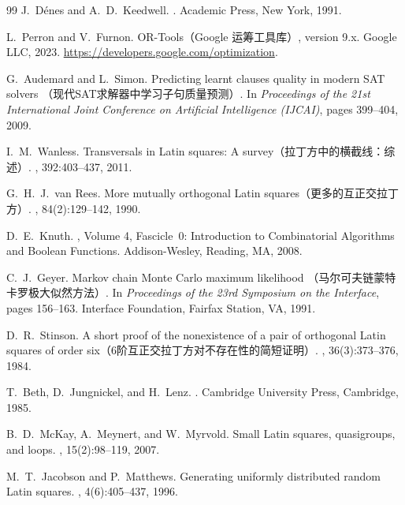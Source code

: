 \documentclass[11pt,a4paper]{ctexart}
\theoremstyle{remark}
\begin{document}
\begin{thebibliography}{99}
J.\ D\'enes and A.\ D.\ Keedwell.
.
\newblock Academic Press, New York, 1991.

L.\ Perron and V.\ Furnon.
\newblock OR-Tools（Google 运筹工具库）, version 9.x.
\newblock Google LLC, 2023.
\newblock \url{https://developers.google.com/optimization}.

G.\ Audemard and L.\ Simon.
\newblock Predicting learnt clauses quality in modern SAT solvers
  （现代SAT求解器中学习子句质量预测）.
\newblock In {\em Proceedings of the 21st International Joint Conference on
  Artificial Intelligence (IJCAI)}, pages 399--404, 2009.

I.\ M.\ Wanless.
\newblock Transversals in Latin squares: A survey（拉丁方中的横截线：综述）.
, 392:403--437,
  2011.

G.\ H.\ J.\ van Rees.
\newblock More mutually orthogonal Latin squares（更多的互正交拉丁方）.
, 84(2):129--142, 1990.

D.\ E.\ Knuth.
,
  Volume 4, Fascicle~0: Introduction to Combinatorial Algorithms and Boolean
  Functions.
\newblock Addison-Wesley, Reading, MA, 2008.

C.\ J.\ Geyer.
\newblock Markov chain Monte Carlo maximum likelihood
  （马尔可夫链蒙特卡罗极大似然方法）.
\newblock In {\em Proceedings of the 23rd Symposium on the Interface},
  pages 156--163. Interface Foundation, Fairfax Station, VA, 1991.

D.\ R.\ Stinson.
\newblock A short proof of the nonexistence of a pair of orthogonal Latin
  squares of order six（6阶互正交拉丁方对不存在性的简短证明）.
, 36(3):373--376,
  1984.

T.\ Beth, D.\ Jungnickel, and H.\ Lenz.
.
\newblock Cambridge University Press, Cambridge, 1985.

B.~D.~McKay, A.~Meynert, and W.~Myrvold.
\newblock Small Latin squares, quasigroups, and loops.
, 15(2):98--119, 2007.

M.~T.~Jacobson and P.~Matthews.
\newblock Generating uniformly distributed random Latin squares.
, 4(6):405--437, 1996.


\end{thebibliography}
\end{document}
